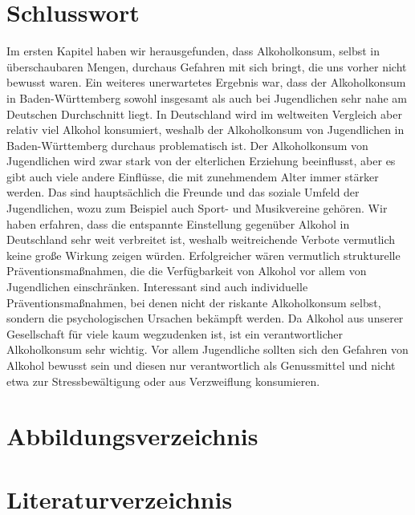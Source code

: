 \documentclass[12pt]{article}
\begin{document}
\section{Schlusswort}
Im ersten Kapitel haben wir herausgefunden, dass Alkoholkonsum, selbst in überschaubaren Mengen, durchaus Gefahren mit sich bringt, die uns vorher nicht bewusst waren. Ein weiteres unerwartetes Ergebnis war, dass der Alkoholkonsum in Baden-Württemberg sowohl insgesamt als auch bei Jugendlichen sehr nahe am Deutschen Durchschnitt liegt. In Deutschland wird im weltweiten Vergleich aber relativ viel Alkohol konsumiert, weshalb der Alkoholkonsum von Jugendlichen in Baden-Württemberg durchaus problematisch ist. Der Alkoholkonsum von Jugendlichen wird zwar stark von der elterlichen Erziehung beeinflusst, aber es gibt auch viele andere Einflüsse, die mit zunehmendem Alter immer stärker werden. Das sind hauptsächlich die Freunde und das soziale Umfeld der Jugendlichen, wozu zum Beispiel auch Sport- und Musikvereine gehören. Wir haben erfahren, dass die entspannte Einstellung gegenüber Alkohol in Deutschland sehr weit verbreitet ist, weshalb weitreichende Verbote vermutlich keine große Wirkung zeigen würden. Erfolgreicher wären vermutlich strukturelle Präventionsmaßnahmen, die die Verfügbarkeit von Alkohol vor allem von Jugendlichen einschränken. Interessant sind auch individuelle Präventionsmaßnahmen, bei denen nicht der riskante Alkoholkonsum selbst, sondern die psychologischen Ursachen bekämpft werden. Da Alkohol aus unserer Gesellschaft für viele kaum wegzudenken ist, ist ein verantwortlicher Alkoholkonsum sehr wichtig. Vor allem Jugendliche sollten sich den Gefahren von Alkohol bewusst sein und diesen nur verantwortlich als Genussmittel und nicht etwa zur Stressbewältigung oder aus Verzweiflung konsumieren.







\clearpage
\section{Abbildungsverzeichnis}
\makeatletter{}\makeatother
\lofwithouttitle
\section{Literaturverzeichnis}
\printbibliography[heading=none]
\end{document}
